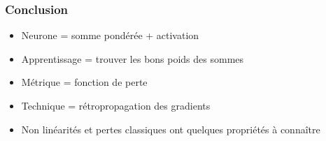 \documentclass{formation}
\begin{document}
\begin{frame}
  \frametitle{Conclusion}
  \begin{itemize}
  \item Neurone = somme pondérée + activation
  \item Apprentissage = trouver les bons poids des sommes
  \item Métrique = fonction de perte
  \item Technique = rétropropagation des gradients
  \item Non linéarités et pertes classiques ont quelques propriétés à
    connaître
  \end{itemize}
\end{frame}
\end{document}
